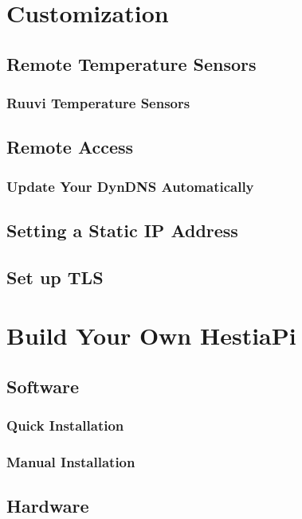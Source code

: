 \documentclass{article}
\begin{document}
\section{Customization}
\subsection{Remote Temperature Sensors} \label{Remote Temperature Sensors}

\subsubsection{Ruuvi Temperature Sensors} \label{Ruuvi Temperature Sensors}

\subsection{Remote Access}

\subsubsection{Update Your DynDNS Automatically}

\subsection{Setting a Static IP Address} \label{Static IP}

\subsection{Set up TLS} \label{Set up TLS}


\section{Build Your Own HestiaPi}
\subsection{Software}
\subsubsection{Quick Installation} \label{Quick Installation}

\subsubsection{Manual Installation}

\subsection{Hardware}
\end{document}
